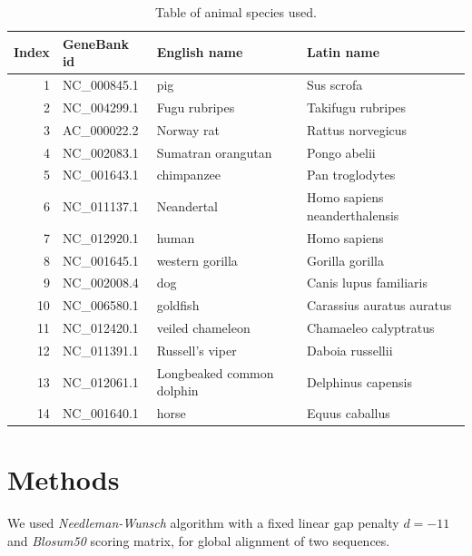 \documentclass[a4paper,11pt]{article}
\begin{document}
\begin{table}[htbp]
\caption{Table of animal species used.}
\label{animalTable}
\begin{center}
\begin{tabular}{rllp{6cm}}
\hline
Index & GeneBank id & English name & Latin name\\
\hline
  1 &   NC\_000845.1 &                        pig &                     Sus scrofa \\
  2 &   NC\_004299.1 &              Fugu rubripes &              Takifugu rubripes \\ 
  3 &   AC\_000022.2 &                 Norway rat &              Rattus norvegicus \\
  4 &   NC\_002083.1 &         Sumatran orangutan &                   Pongo abelii \\
  5 &   NC\_001643.1 &                 chimpanzee &                Pan troglodytes \\
  6 &   NC\_011137.1 &                 Neandertal &  Homo sapiens neanderthalensis \\
  7 &   NC\_012920.1 &                      human &                   Homo sapiens \\
  8 &   NC\_001645.1 &            western gorilla &                Gorilla gorilla \\
  9 &   NC\_002008.4 &                        dog &         Canis lupus familiaris \\
 10 &   NC\_006580.1 &                   goldfish &      Carassius auratus auratus \\
 11 &   NC\_012420.1 &           veiled chameleon &          Chamaeleo calyptratus \\
 12 &   NC\_011391.1 &            Russell's viper &               Daboia russellii \\
 13 &   NC\_012061.1 &  Longbeaked common dolphin &             Delphinus capensis \\
 14 &   NC\_001640.1 &                      horse &                 Equus caballus \\
\hline
\end{tabular}
\end{center}
\end{table}


\section{Methods}

We used \textit{Needleman-Wunsch} algorithm with a fixed linear gap penalty $d=-11$ and \textit{Blosum50} scoring matrix, for global alignment of two sequences.\\
\end{document}
